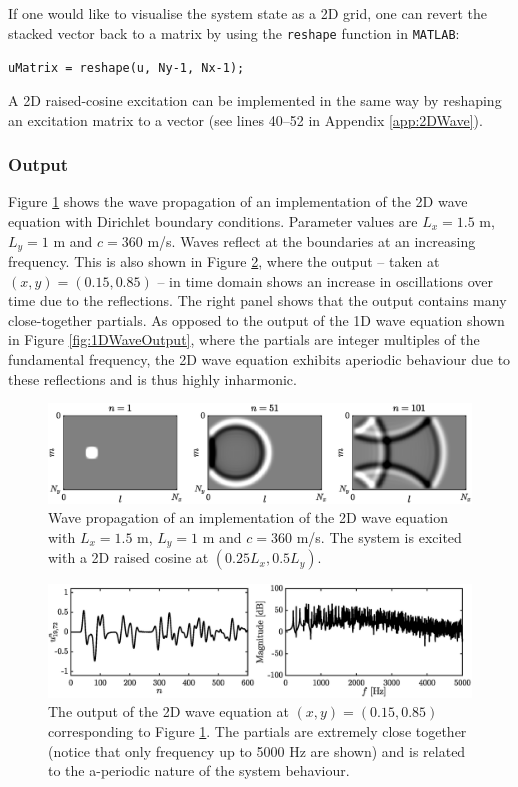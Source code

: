 If one would like to visualise the system state as a 2D grid, one can revert the stacked vector back to a matrix by using the \texttt{reshape} function in \texttt{MATLAB}:
\begin{center}
    \texttt{uMatrix = reshape(u, Ny-1, Nx-1);}
\end{center}
A 2D raised-cosine excitation can be implemented in the same way by reshaping an excitation matrix to a vector (see lines 40--52 in Appendix \ref{app:2DWave}).

\subsubsection{Output}
Figure \ref{fig:2Dpropagation} shows the wave propagation of an implementation of the 2D wave equation with Dirichlet boundary conditions. Parameter values are $L_x = 1.5$ m, $L_y = 1$ m and $c= 360$ m/s. Waves reflect at the boundaries at an increasing frequency. This is also shown in Figure \ref{fig:output2DWave}, where the output -- taken at $(x,y) = (0.15, 0.85)$ -- in time domain shows an increase in oscillations over time due to the reflections. The right panel shows that the output contains many close-together partials. As opposed to the output of the 1D wave equation shown in Figure \ref{fig:1DWaveOutput}, where the partials are integer multiples of the fundamental frequency, the 2D wave equation exhibits aperiodic behaviour due to these reflections and is thus highly inharmonic.

\begin{figure}[h]
    \centering
    \includegraphics[width=\textwidth]{figures/resonators/2d/twoDPropagation.eps}
    \caption{Wave propagation of an implementation of the 2D wave equation with $L_x = 1.5$ m, $L_y = 1$ m and $c= 360$ m/s. The system is excited with a 2D raised cosine at $(0.25L_x, 0.5L_y)$.\label{fig:2Dpropagation}}
\end{figure}

\begin{figure}[h]
    \centering
    \includegraphics[width=\textwidth]{figures/resonators/2d/output2Dwave.eps}
    \caption{The output of the 2D wave equation at $(x,y) = (0.15, 0.85)$ corresponding to Figure \ref{fig:2Dpropagation}. The partials are extremely close together (notice that only frequency up to 5000 Hz are shown) and is related to the a-periodic nature of the system behaviour. \label{fig:output2DWave}}
\end{figure}

